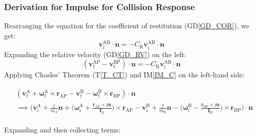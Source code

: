 \documentclass[12pt]{article}
\begin{document}
\subsubsection*{Derivation for Impulse for Collision Response}

Rearranging the equation for the coefficient of restitution (GD\ref{GD_COR}), we get:
$$\mathbf{v}^\mathrm{AB}_\mathrm{f} \cdot \mathbf{n} = -C_\mathrm{R}\mathbf{v}^\mathrm{AB}_\mathrm{i} \cdot \mathbf{n}$$
\noindent Expanding the relative velocity (GD\ref{GD_RV}) on the left:
$$(\mathbf{v}^\mathrm{AP}_\mathrm{f} - \mathbf{v}^\mathrm{BP}_\mathrm{f}) \cdot \mathbf{n} = -C_\mathrm{R}\mathbf{v}^\mathrm{AB}_\mathrm{i} \cdot \mathbf{n}$$
\noindent
Applying Chasles' Theorem (T\ref{T_CT}) and IM\ref{IM_C} on the left-hand side: 

\begin{equation*}
\begin{aligned}
& (\mathbf{v}^\mathrm{A}_\mathrm{f} + \boldsymbol{\omega}^\mathrm{A}_\mathrm{f} \times \mathbf{r}_\mathrm{AP} - \mathbf{v}^\mathrm{B}_\mathrm{f} - \boldsymbol{\omega}^\mathrm{B}_\mathrm{f} \times \mathbf{r}_\mathrm{BP}) \cdot \mathbf{n} \\
&\implies \bigg(\mathbf{v}^\mathrm{A}_\mathrm{i} + \frac{j}{m_\mathrm{A}}\mathbf{n} + \bigg(\boldsymbol{\omega}^\mathrm{A}_\mathrm{i} + \frac{\mathbf{r}_\mathrm{AP} \times j\mathbf{n}}{\mathbf{I}_\mathrm{A}}\bigg) \times \mathbf{r}_\mathrm{AP} - \mathbf{v}^\mathrm{B}_\mathrm{i} + \frac{j}{m_\mathrm{B}}\mathbf{n} - \bigg(\boldsymbol{\omega}^\mathrm{B}_\mathrm{i} - \frac{\mathbf{r}_\mathrm{BP} \times j\mathbf{n}}{\mathbf{I}_\mathrm{B}}\bigg) \times \mathbf{r}_\mathrm{BP}\bigg) \cdot \mathbf{n}
\end{aligned}
\end{equation*}
\\
\noindent
Expanding and then collecting terms:
\end{document}
